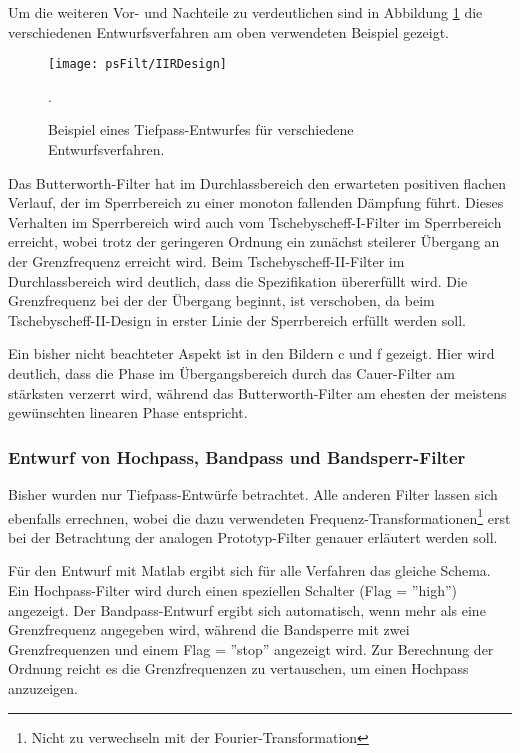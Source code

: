Um die weiteren Vor- und Nachteile zu verdeutlichen sind in Abbildung \ref{pic:IIR:DesignBsp} die
verschiedenen Entwurfsverfahren am oben verwendeten Beispiel gezeigt.
\begin{figure}[H]
\begin{center}
\texttt{[image: psFilt/IIRDesign]}
\caption{\label{pic:IIR:DesignBsp}Beispiel eines Tiefpass-Entwurfes für verschiedene Entwurfsverfahren.}.
\end{center}
\end{figure}

Das Butterworth-Filter hat im Durchlassbereich den erwarteten positiven flachen Verlauf, der im Sperrbereich
zu einer monoton fallenden Dämpfung führt. Dieses Verhalten im Sperrbereich wird auch vom
Tschebyscheff-I-Filter im Sperrbereich erreicht, wobei trotz der geringeren Ordnung ein
zunächst steilerer Übergang an der Grenzfrequenz erreicht wird. Beim Tschebyscheff-II-Filter
im Durchlassbereich wird deutlich, dass die Spezifikation übererfüllt wird. Die Grenzfrequenz
bei der der Übergang beginnt, ist verschoben, da beim Tschebyscheff-II-Design in erster
Linie der Sperrbereich erfüllt werden soll.

Ein bisher nicht beachteter Aspekt ist in den Bildern c und f gezeigt. Hier wird deutlich,
dass die Phase im Übergangsbereich durch das Cauer-Filter am stärksten verzerrt wird, während das
Butterworth-Filter am ehesten der meistens gewünschten linearen Phase entspricht.


\subsubsection{Entwurf von Hochpass, Bandpass und Bandsperr-Filter}
Bisher wurden nur Tiefpass-Entwürfe betrachtet. Alle anderen Filter lassen sich ebenfalls
errechnen, wobei die dazu verwendeten Frequenz-Transformationen\footnote{Nicht zu verwechseln mit
der Fourier-Transformation} erst bei der Betrachtung der analogen Prototyp-Filter genauer
erläutert werden soll.

Für den Entwurf mit Matlab ergibt sich für alle Verfahren das gleiche Schema. Ein Hochpass-Filter
wird durch einen speziellen Schalter (Flag = ''high'') angezeigt. Der Bandpass-Entwurf ergibt sich
automatisch, wenn mehr als eine Grenzfrequenz angegeben wird, während die Bandsperre mit zwei
Grenzfrequenzen und einem Flag = ''stop'' angezeigt wird. Zur Berechnung der Ordnung
reicht es die Grenzfrequenzen zu vertauschen, um einen Hochpass anzuzeigen.


